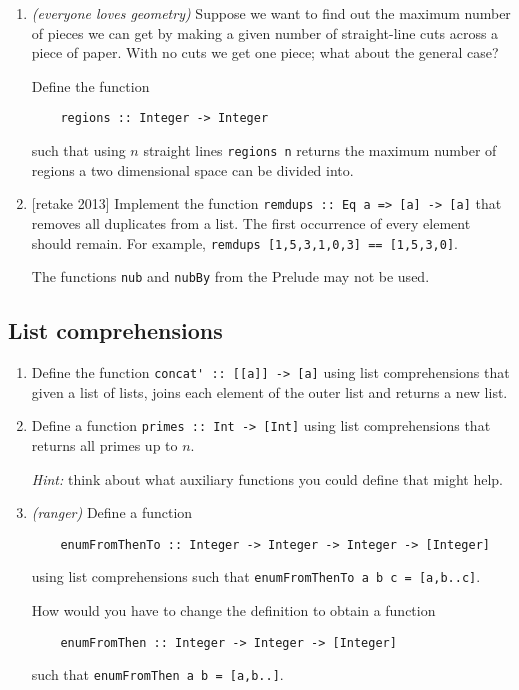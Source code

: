 \documentclass{article}
\def\code#1{\texttt{#1}}
\begin{document}
\begin{enumerate}
\item \cite[p. 85]{thompson} \textit{(everyone loves geometry)} Suppose we want to find out the maximum number of pieces we can get by making a given number of straight-line cuts across a piece of paper. With no cuts we get one piece; what about the general case? \par
Define the function
\begin{verbatim}
    regions :: Integer -> Integer
\end{verbatim}
such that using $n$ straight lines \verb|regions n| returns the maximum number of regions a two dimensional space can be divided into.

\item {[retake 2013]} Implement the function \code{remdups :: Eq a => [a] -> [a]} that removes all duplicates from a list. The first occurrence of every element should remain. For example, \code{remdups [1,5,3,1,0,3] == [1,5,3,0]}. \par
The functions \code{nub} and \code{nubBy} from the Prelude may not be used.
\end{enumerate}

\subsection{List comprehensions}
\begin{enumerate}
\item Define the function \verb|concat' :: [[a]] -> [a]| using list comprehensions that given a list of lists, joins each element of the outer list and returns a new list.

\item Define a function \verb|primes :: Int -> [Int]| using list comprehensions that returns all primes up to $n$. \par
\textit{Hint:} think about what auxiliary functions you could define that might help.

\item \textit{(ranger)} Define a function
\begin{verbatim}
    enumFromThenTo :: Integer -> Integer -> Integer -> [Integer]
\end{verbatim}
using list comprehensions such that \verb|enumFromThenTo a b c = [a,b..c]|. \par
How would you have to change the definition to obtain a function
\begin{verbatim}
    enumFromThen :: Integer -> Integer -> [Integer]
\end{verbatim}
such that \verb|enumFromThen a b = [a,b..]|.
\end{enumerate}
\end{document}
